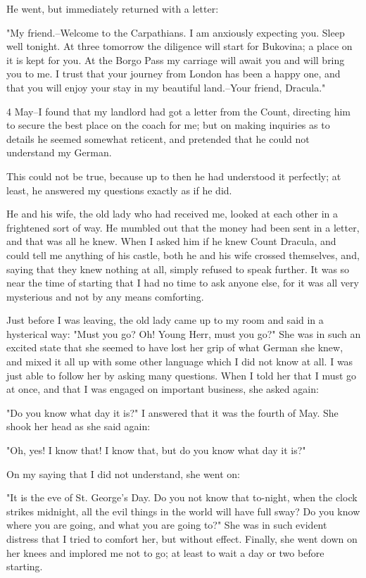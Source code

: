 He went, but immediately returned with a letter: 

"My friend.--Welcome to the Carpathians. I am anxiously expecting you. Sleep well tonight. At three tomorrow the diligence will start for Bukovina; a place on it is kept for you. At the Borgo Pass my carriage will await you and will bring you to me. I trust that your journey from London has been a happy one, and that you will enjoy your stay in my beautiful land.--Your friend, Dracula." 

4 May--I found that my landlord had got a letter from the Count, directing him to secure the best place on the coach for me; but on making inquiries as to details he seemed somewhat reticent, and pretended that he could not understand my German. 

This could not be true, because up to then he had understood it perfectly; at least, he answered my questions exactly as if he did. 

He and his wife, the old lady who had received me, looked at each other in a frightened sort of way. He mumbled out that the money had been sent in a letter, and that was all he knew. When I asked him if he knew Count Dracula, and could tell me anything of his castle, both he and his wife crossed themselves, and, saying that they knew nothing at all, simply refused to speak further. It was so near the time of starting that I had no time to ask anyone else, for it was all very mysterious and not by any means comforting. 

Just before I was leaving, the old lady came up to my room and said in a hysterical way: "Must you go? Oh! Young Herr, must you go?" She was in such an excited state that she seemed to have lost her grip of what German she knew, and mixed it all up with some other language which I did not know at all. I was just able to follow her by asking many questions. When I told her that I must go at once, and that I was engaged on important business, she asked again: 

"Do you know what day it is?" I answered that it was the fourth of May. She shook her head as she said again: 

"Oh, yes! I know that! I know that, but do you know what day it is?" 

On my saying that I did not understand, she went on: 

"It is the eve of St. George's Day. Do you not know that to-night, when the clock strikes midnight, all the evil things in the world will have full sway? Do you know where you are going, and what you are going to?" She was in such evident distress that I tried to comfort her, but without effect. Finally, she went down on her knees and implored me not to go; at least to wait a day or two before starting. 

